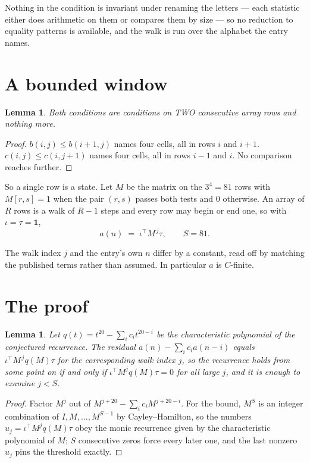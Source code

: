 \documentclass[11pt,a4paper]{article}
\theoremstyle{plain}
\newtheorem{lemma}[theorem]{Lemma}
\theoremstyle{definition}
\begin{document}
Nothing in the condition is invariant under renaming the letters --- each statistic either does
arithmetic on them or compares them by size --- so no reduction to equality patterns is
available, and the walk is run over the alphabet the entry names.

\section{A bounded window}

\begin{lemma}\label{lem:win}
Both conditions are conditions on TWO consecutive array rows and nothing more.
\end{lemma}

\begin{proof}
$b(i,j)\le b(i{+}1,j)$ names four cells, all in rows $i$ and $i+1$. $c(i,j)\le c(i,j{+}1)$
names four cells, all in rows $i-1$ and $i$. No comparison reaches further.
\end{proof}

So a single row is a state. Let $M$ be the matrix on the $3^{4}=81$ rows with
$M[r,s]=1$ when the pair $(r,s)$ passes both tests and $0$ otherwise. An array of $R$ rows is a
walk of $R-1$ steps and every row may begin or end one, so with $\iota=\tau=\mathbf{1}$,
\[
a(n)\;=\;\iota^{\!\top}M^{\,j}\tau ,\qquad S=81.
\]

The walk index $j$ and the entry's own $n$ differ by a constant, read off by matching the
published terms rather than assumed. In particular $a$ is $C$-finite.

\section{The proof}

\begin{lemma}\label{lem:crit}
Let $q(t)=t^{20}-\sum_i c_it^{20-i}$ be the characteristic polynomial of the
conjectured recurrence. The residual $a(n)-\sum_ic_ia(n-i)$ equals
$\iota^{\!\top}M^{\,j}q(M)\tau$ for the corresponding walk index $j$, so the recurrence
holds from some point on if and only if $\iota^{\!\top}M^{j}q(M)\tau=0$ for all large $j$,
and it is enough to examine $j<S$.
\end{lemma}

\begin{proof}
Factor $M^{j}$ out of $M^{j+20}-\sum_ic_iM^{j+20-i}$. For the bound, $M^{S}$
is an integer combination of $I,M,\dots,M^{S-1}$ by Cayley--Hamilton, so the numbers
$u_j=\iota^{\!\top}M^{j}q(M)\tau$ obey the monic recurrence given by the characteristic
polynomial of $M$; $S$ consecutive zeros force every later one, and the last nonzero $u_j$
pins the threshold exactly.
\end{proof}
\end{document}
